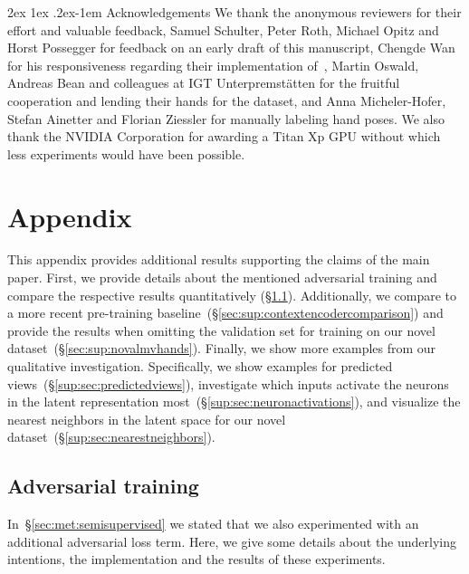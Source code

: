 \documentclass[10pt,twocolumn,letterpaper]{article}
\makeatletter
\renewcommand{\paragraph}{%
  \@startsection{paragraph}{4}%
  {\z@}{2ex \@plus 1ex \@minus .2ex}{-1em}%
  {\normalfont\normalsize\bfseries}%
}
\makeatother
\begin{document}
{
\paragraph{Acknowledgements}
We thank the anonymous reviewers for their effort and valuable feedback, 
Samuel Schulter, Peter Roth, Michael Opitz and Horst Possegger 
for feedback on an early draft of this manuscript, 
Chengde Wan for his responsiveness regarding their implementation 
of~\cite{Wan2017cvpr_crossingnets},
Martin Oswald, Andreas Bean and colleagues at IGT Unterpremst\"atten 
for the fruitful cooperation and lending their hands for the dataset, and
Anna Micheler-Hofer, Stefan Ainetter and Florian Ziessler 
for manually labeling hand poses.
We also thank the NVIDIA Corporation for awarding a Titan Xp GPU 
without which less experiments would have been possible.
}

{\small


}


\clearpage
{}
\setcounter{page}{1}
\appendix

\section{Appendix}
This appendix provides additional results 
supporting the claims of the main paper.
First, we provide details about the mentioned adversarial training and
compare the respective results quantitatively (\S\ref{sup:sec:adversarial}).
Additionally, we compare to a more recent pre-training 
baseline~(\S\ref{sec:sup:contextencodercomparison}) and 
provide the results when omitting the validation set for training on our novel 
dataset~(\S\ref{sec:sup:novalmvhands}).
Finally, we show more examples from our qualitative investigation.
Specifically, we show examples for predicted views~(\S\ref{sup:sec:predictedviews}),
investigate which inputs activate the neurons in the latent representation 
most~(\S\ref{sup:sec:neuronactivations}), 
and visualize the nearest neighbors in the latent space for our novel 
dataset~(\S\ref{sup:sec:nearestneighbors}).



\subsection{Adversarial training}\label{sup:sec:adversarial}
In~\S\ref{sec:met:semisupervised} we stated that we also experimented with an 
additional adversarial loss term. 
Here, we give some details about the underlying intentions, 
the implementation and the results of these experiments.
\end{document}
